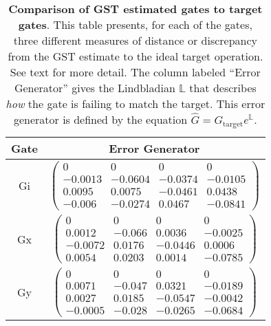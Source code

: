 {\begin{table}[h]
\begin{center}
\vspace{2em}
\begin{tabular}[l]{|c|c|}
\hline
Gate & Error Generator \\ \hline
Gi & $ \left(\!\!\begin{array}{cccc}
0 & 0 & 0 & 0 \\ 
-0.0013 & -0.0604 & -0.0374 & -0.0105 \\ 
0.0095 & 0.0075 & -0.0461 & 0.0438 \\ 
-0.006 & -0.0274 & 0.0467 & -0.0841
 \end{array}\!\!\right) $
 \\ \hline
Gx & $ \left(\!\!\begin{array}{cccc}
0 & 0 & 0 & 0 \\ 
0.0012 & -0.066 & 0.0036 & -0.0025 \\ 
-0.0072 & 0.0176 & -0.0446 & 0.0006 \\ 
0.0054 & 0.0203 & 0.0014 & -0.0785
 \end{array}\!\!\right) $
 \\ \hline
Gy & $ \left(\!\!\begin{array}{cccc}
0 & 0 & 0 & 0 \\ 
0.0071 & -0.047 & 0.0321 & -0.0189 \\ 
0.0027 & 0.0185 & -0.0547 & -0.0042 \\ 
-0.0005 & -0.028 & -0.0265 & -0.0684
 \end{array}\!\!\right) $
 \\ \hline
\end{tabular}

\caption{\textbf{Comparison of GST estimated gates to target gates}.  This table presents, for each of the gates, three different measures of distance or discrepancy from the GST estimate to the ideal target operation.  See text for more detail.  The column labeled ``Error Generator'' gives the Lindbladian $\mathbb{L}$ that describes \emph{how} the gate is failing to match the target.  This error generator is defined by the equation $\hat{G} = G_{\mathrm{target}}e^{\mathbb{L}}$. \label{bestCPTPGatesetVsTargetTable}}
\end{center}
\end{table}

}
